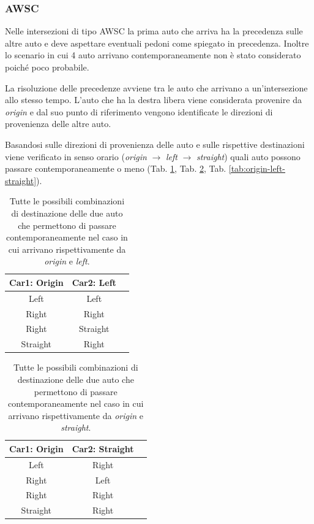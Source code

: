 \subsubsection{AWSC}
\label{subsubsec:precedenze}
Nelle intersezioni di tipo AWSC la prima auto che arriva ha la precedenza sulle altre auto e deve aspettare eventuali pedoni come spiegato in precedenza.
Inoltre lo scenario in cui 4 auto arrivano contemporaneamente non è stato considerato poiché poco probabile.

La risoluzione delle precedenze avviene tra le auto che arrivano a un'intersezione allo stesso tempo.
L'auto che ha la destra libera viene considerata provenire da \textit{origin} e dal suo punto di riferimento
vengono identificate le direzioni di provenienza delle altre auto.

Basandosi sulle direzioni di provenienza delle auto e sulle rispettive destinazioni viene verificato
in senso orario (\textit{origin} $\rightarrow$ \textit{left} $\rightarrow$ \textit{straight})
quali auto possono passare contemporaneamente o meno (Tab. \ref{tab:origin-left}, Tab. \ref{tab:origin-straight}, Tab. \ref{tab:origin-left-straight}).


\begin{table}[ht]
    \centering
    \begin{tabular}{|c|c|c|}
        \hline
        \textbf{Car1: Origin} & \textbf{Car2: Left} \\ \hline
        Left                  & Left                \\ \hline
        Right                 & Right               \\ \hline
        Right                 & Straight            \\ \hline
        Straight              & Right               \\ \hline
    \end{tabular}
    \caption{Tutte le possibili combinazioni di destinazione delle due auto che permettono
        di passare contemporaneamente nel caso in cui arrivano rispettivamente da \textit{origin} e \textit{left}.}
    \label{tab:origin-left}
\end{table}

\begin{table}[ht]
    \centering
    \begin{tabular}{|c|c|c|}
        \hline
        \textbf{Car1: Origin} & \textbf{Car2: Straight} \\ \hline
        Left                  & Right                   \\ \hline
        Right                 & Left                    \\ \hline
        Right                 & Right                   \\ \hline
        Straight              & Right                   \\ \hline
    \end{tabular}
    \caption{Tutte le possibili combinazioni di destinazione delle due auto che permettono
        di passare contemporaneamente nel caso in cui arrivano rispettivamente da \textit{origin} e \textit{straight}.}
    \label{tab:origin-straight}
\end{table}

